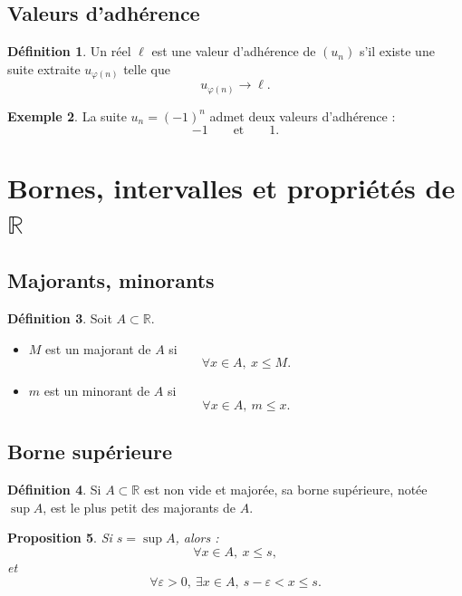 \documentclass[11pt,a4paper]{article}
\theoremstyle{definition}
\newtheorem{definition}{Définition}[section]
\newtheorem{exemple}[definition]{Exemple}
\theoremstyle{plain}
\newtheorem{proposition}[definition]{Proposition}
\newcommand{\R}{\mathbb{R}}
\newcommand{\eps}{\varepsilon}
\begin{document}
\subsection{Valeurs d'adhérence}

\begin{definition}
Un réel $\ell$ est une valeur d'adhérence de $(u_n)$ s'il existe une suite extraite $u_{\varphi(n)}$ telle que
\[
u_{\varphi(n)}\to \ell.
\]
\end{definition}

\begin{exemple}
La suite $u_n=(-1)^n$ admet deux valeurs d'adhérence :
\[
-1
\qquad\text{et}\qquad
1.
\]
\end{exemple}

\section{Bornes, intervalles et propriétés de $\R$}

\subsection{Majorants, minorants}

\begin{definition}
Soit $A\subset\R$.
\begin{itemize}
    \item $M$ est un majorant de $A$ si
    \[
    \forall x\in A,\ x\leq M.
    \]
    \item $m$ est un minorant de $A$ si
    \[
    \forall x\in A,\ m\leq x.
    \]
\end{itemize}
\end{definition}

\subsection{Borne supérieure}

\begin{definition}
Si $A\subset\R$ est non vide et majorée, sa borne supérieure, notée $\sup A$, est le plus petit des majorants de $A$.
\end{definition}

\begin{proposition}
Si $s=\sup A$, alors :
\[
\forall x\in A,\ x\leq s,
\]
et
\[
\forall \eps>0,\ \exists x\in A,\ s-\eps<x\leq s.
\]
\end{proposition}
\end{document}
